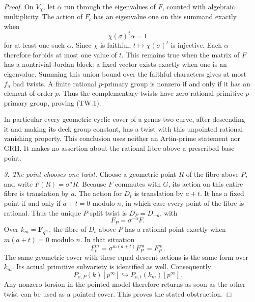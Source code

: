 \documentclass[11pt,a4paper]{article}
\begin{document}
\begin{proof}
On $V_\chi$, let $\alpha$ run through the eigenvalues of $F$,
counted with algebraic multiplicity. The action of $F_t$ has
an eigenvalue one on this summand exactly when
\[
                         \chi(\sigma)^t\alpha=1
 \tag{TW.4}
\]
for at least one such $\alpha$. Since $\chi$ is faithful,
$t\mapsto\chi(\sigma)^t$ is injective. Each $\alpha$ therefore
forbids at most one value of $t$. This remains true when the
matrix of $F$ has a nontrivial Jordan block: a fixed vector
exists exactly when one is an eigenvalue. Summing this union
bound over the faithful characters gives at most $f_n$ bad
twists. A finite rational $p$-primary group is nonzero if and
only if it has an element of order $p$. Thus the complementary
twists have zero rational primitive $p$-primary group, proving
(TW.1).

In particular every geometric cyclic cover of a genus-two
curve, after descending it and making its deck group constant,
has a twist with this unpointed rational vanishing property.
This conclusion uses neither an Artin-prime statement nor GRH.
It makes no assertion about the rational fibre above a
prescribed base point.

\emph{3. The point chooses one twist.}
Choose a geometric point $R$ of the fibre above $P$, and write
$F(R)=\sigma^a R$. Because $F$ commutes with $G$, its action
on this entire fibre is translation by $a$. The action for
$D_t$ is translation by $a+t$. It has a fixed point if and
only if $a+t=0$ modulo $n$, in which case every point of the
fibre is rational. Thus the unique $P$-split twist is
$D_P=D_{-a}$, with
\[
                              F_P=\sigma^{-a}F.
\]
Over $k_m=\mathbf F_{q^m}$, the fibre of $D_t$ above $P$
has a rational point exactly when $m(a+t)=0$ modulo $n$.
In that situation
\[
 F_t^m=\sigma^{m(a+t)}F_P^m=F_P^m.
 \tag{TW.5}
\]
The same geometric cover with these equal descent actions is
the same form over $k_m$. Its actual primitive subvariety is
identified as well. Consequently
\[
             P_{n,P}(k)[p^\infty]
                      \hookrightarrow P_{n,t}(k_m)[p^\infty].
 \tag{TW.6}
\]
Any nonzero torsion in the pointed model therefore returns as
soon as the other twist can be used as a pointed cover.
This proves the stated obstruction.


\end{proof}
\end{document}
